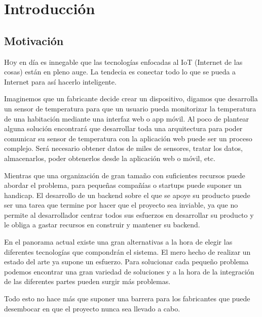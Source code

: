 \chapter{Introducción}\label{chp-01}

\section{Motivación}

\lettrine[lraise=-0.1, lines=2, loversize=0.2]{H}oy en día es innegable que
las tecnologías enfocadas al IoT (Internet de las
cosas) están en pleno auge. La tendecia es conectar todo lo que se pueda a
Internet para así hacerlo inteligente.

Imaginemos que un fabricante decide crear un dispositivo, digamos que desarrolla
un sensor de temperatura para que un usuario pueda monitorizar la temperatura
de una habitación mediante una interfaz web o app móvil. Al poco de plantear
alguna solución encontrará que desarrollar toda una arquitectura para poder
comunicar su sensor de temperatura con la aplicación web puede ser un proceso
complejo. Será necesario obtener datos de miles de sensores, tratar los datos,
almacenarlos, poder obtenerlos desde la aplicación web o móvil, etc.

Mientras que una organización de gran tamaño con suficientes recursos puede
abordar el problema, para pequeñas compañías o startups puede suponer un
handicap. El desarrollo de un backend sobre el que se apoye su producto puede
ser una tarea que termine por hacer que el proyecto sea inviable, ya que no
permite al desarrollador centrar todos sus esfuerzos en desarrollar su producto
y le obliga a gastar recursos en construir y mantener su backend.

En el panorama actual existe una gran alternativas a la hora de elegir las
diferentes tecnologías que compondrán el sistema. El mero hecho de realizar
un estado del arte ya supone un esfuerzo. Para solucionar cada pequeño problema
podemos encontrar una gran variedad de soluciones y a la hora de la integración
de las diferentes partes pueden surgir más problemas.

Todo esto no hace más que suponer una barrera para los fabricantes que puede
desembocar en que el proyecto nunca sea llevado a cabo.
